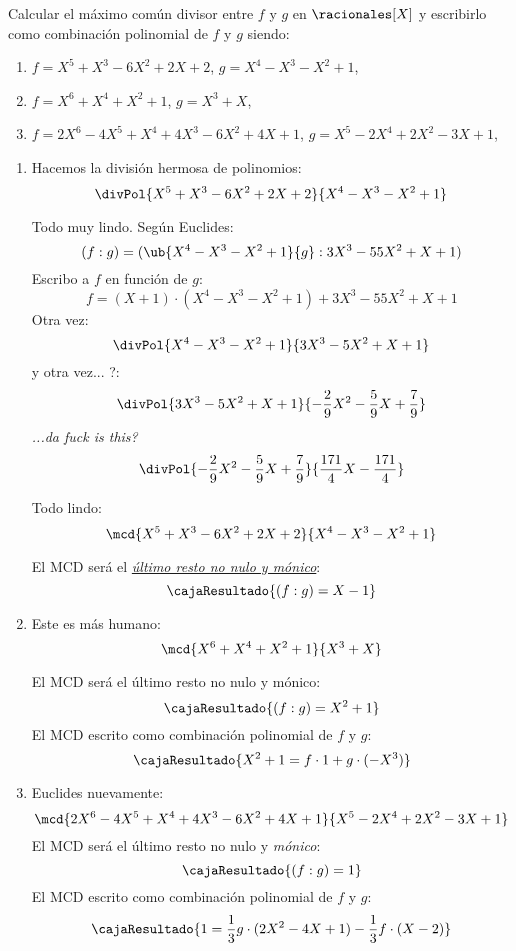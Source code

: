 \begin{enunciado}{\ejercicio}
  Calcular el máximo común divisor entre $f$ y $g$ en $\racionales[X]$ y escribirlo como combinación
  polinomial de $f$ y $g$ siendo:
  \def\f1{X^5 + X^3 - 6X^2 + 2X +2}
  \def\g1{X^4 - X^3 - X^2 + 1}
  \begin{enumerate}[label=\roman*)]
    \item $f = \f1$, $g = \g1$,

    \item $f = X^6 + X^4 + X^2  +1$, $g = X^3 + X$,

    \item $f = 2X^6 - 4X^5 + X^4 + 4X^3 - 6X^2 + 4X + 1$, $g = X^5 - 2X^4 + 2X^2 - 3X + 1$,
  \end{enumerate}
\end{enunciado}

\begin{enumerate}[label=\roman*)]
  \item Hacemos la división hermosa de polinomios:
        $$
          \divPol{X^5 + X^3 - 6X^2 + 2X +2}{X^4 - X^3 - X^2 + 1}
        $$

        Todo muy lindo. Según Euclides:
        $$
          (f : g) = (\ub{X^4 - X^3 - X^2 + 1}{g} : 3X^3 -55X^2 +X + 1)
        $$
        Escribo a $f$ en función de $g$:
        $$
          f = (X+1) \cdot (X^4 - X^3 - X^2 + 1) + 3X^3 -55X^2 +X + 1
        $$
        Otra vez:
        $$
          \divPol{X^4 - X^3 - X^2 + 1}{3X^3 -5X^2 +X + 1}
        $$
        y otra vez... ?:
        $$
          \divPol{3X^3 -5X^2 +X + 1}{- \frac{2}{9}X^2-\frac{5}{9}X+\frac{7}{9}}
        $$
        \textit{...da fuck is this?}
        $$
          \divPol{- \frac{2}{9}X^2-\frac{5}{9}X+\frac{7}{9}}{\frac{171}{4}X - \frac{171}{4}}
        $$

        Todo lindo:
        $$
          \mcd{X^5 + X^3 - 6X^2 + 2X +2}{X^4 - X^3 - X^2 + 1}
        $$

        El MCD será el \textit{\underline{último resto no nulo y mónico}}:
        $$
          \cajaResultado{
            (f : g) = X - 1
          }
        $$

  \item Este es más humano:
        $$
          \mcd{X^6 + X^4 + X^2  +1}{X^3 + X}
        $$

        El MCD será el último resto no nulo y mónico:
        $$
          \cajaResultado{ (f : g) = X^2+1}
        $$
        El MCD escrito como combinación polinomial de $f$ y $g$:
        $$
          \cajaResultado{ X^2 + 1 = f \cdot 1 + g \cdot (-X^3)}
        $$

  \item
        Euclides nuevamente:
        $$
          \mcd{2X^6 - 4X^5 + X^4 + 4X^3 - 6X^2 + 4X + 1}{X^5 - 2X^4 + 2X^2 - 3X + 1}
        $$
        El MCD será el último resto no nulo y \textit{mónico}:
        $$
          \cajaResultado{
            (f : g) = 1
          }
        $$
        El MCD escrito como combinación polinomial de $f$ y $g$:
        $$
          \cajaResultado{
            1 = \frac{1}{3} g \cdot(2X^2-4X+1) - \frac{1}{3} f \cdot (X-2)
          }
        $$

\end{enumerate}

\begin{aportes}
  \item {}
\end{aportes}
